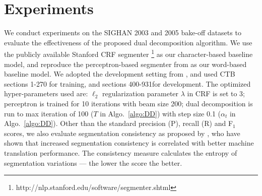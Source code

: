 \section{Experiments}


We conduct experiments on the SIGHAN 2003 \cite{Sproat:2003:SIGHAN} and 2005 \cite{Emerson:2005:SIGHAN} bake-off datasets to evaluate the effectiveness of the proposed dual decomposition algorithm. We use the publicly available Stanford CRF segmenter \cite{Tseng:2005:SIGHAN}\footnote{http://nlp.stanford.edu/software/segmenter.shtml} as our character-based baseline model, and reproduce the perceptron-based segmenter from  as our word-based baseline model.
We adopted the development setting from \cite{Zhang:2007:ACL}, and used CTB sections 1-270 for training, and sections 400-931for development. The optimized hyper-parameters used are: $\ell_{2}$ regularization parameter $\lambda$ in CRF is set to $3$; perceptron is trained for 10 iterations with beam size 200; dual decomposition is run to max iteration of 100 ($T$ in Algo.~\ref{algo:DD}) with step size 0.1 ($\alpha_t$ in Algo.~\ref{algo:DD}). Other than the standard precision (P), recall (R) and F$_1$ scores, we also evaluate segmentation consistency as proposed by \cite{Chang:2008:ACL}, who have shown that increased segmentation consistency is correlated with better machine translation performance. The consistency measure calculates the entropy of segmentation variations --- the lower the score the better. 
